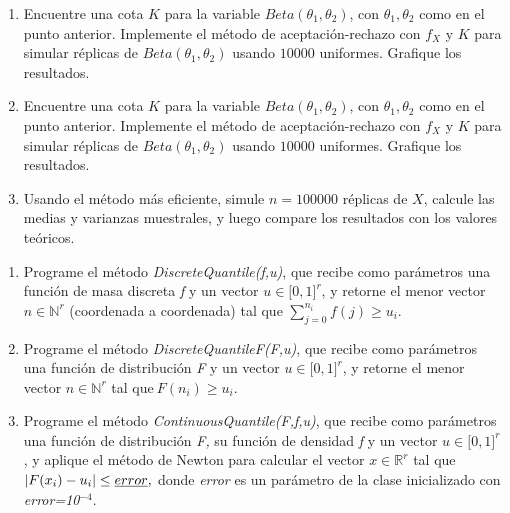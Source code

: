 \begin{enumerate}
    \item Encuentre una cota $K$ para la variable $Beta(\theta_1,\theta_2)$, con $\theta_1,\theta_2$ como en el punto anterior. Implemente el método de aceptación-rechazo con $f_X$ y $K$ para simular réplicas de $Beta(\theta_1,\theta_2)$ usando $10000$ uniformes. Grafique los resultados.
    
    \item Encuentre una cota $K$ para la variable $Beta(\theta_1,\theta_2)$, con $\theta_1,\theta_2$ como en el punto anterior. Implemente el método de aceptación-rechazo con $f_X$ y $K$ para simular réplicas de $Beta(\theta_1,\theta_2)$ usando $10000$ uniformes. Grafique los resultados.
    
    \item Usando el método más eficiente, simule $n = 100000$ réplicas de $X$, calcule las medias y varianzas muestrales, y luego compare los resultados con los valores teóricos.
\end{enumerate}

\iffalse
\begin{enumerate}
  \item Programe el m\'{e}todo \emph{DiscreteQuantile(f,u)}, que recibe como par\'{a}metros una funci\'{o}n de masa discreta \emph{f} y un vector $u\in \lbrack 0,1]^{r}$, y retorne el menor vector $n\in\mathbb{N}^r$ (coordenada a coordenada) tal que $\sum_{j=0}^{n_i}f(j)\geq u_i.$

  \item Programe el m\'{e}todo \emph{DiscreteQuantileF(F,u)}, que recibe como par\'{a}metros una funci\'{o}n de distribuci\'{o}n \emph{F} y un vector $u\in \lbrack 0,1]^{r}$, y retorne el menor vector $n\in\mathbb{N}^r$ tal que$\ F(n_i)\geq u_i.$

\item Programe el m\'{e}todo \emph{ContinuousQuantile(F,f,u)}, que recibe como par\'{a}metros una funci\'{o}n de distribuci\'{o}n \emph{F,} su funci\'{o}n de densidad \emph{f} y un vector $u\in \lbrack 0,1]^{r}$, y aplique el m\'{e}todo de Newton para calcular el vector $x\in\mathbb{R}^r$ tal que $\left\vert F(x_{i})-u_{i}\right\vert \leq \emph{error},$ donde \emph{error} es un par\'{a}metro de la clase inicializado con \emph{error=10}$^{-4}.$
\end{enumerate}

